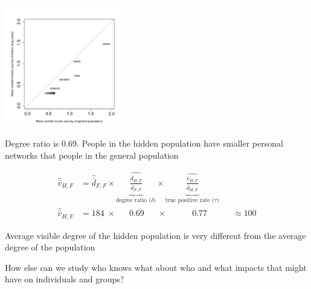 \documentclass[aspectratio=169]{beamer}
\begin{document}
\begin{frame}

\begin{center}	
\includegraphics[width=0.4\textwidth]{figures/degreeratio_names}
\end{center}

Degree ratio is 0.69.  People in the hidden population have smaller personal networks that people in the general population

\end{frame}
\begin{frame}

\begin{align*}
\hat{\bar{v}}_{H,F} & = \hat{\bar{d}}_{F,F}  \times \underbrace{ \widehat{ \frac{ \bar{d}_{H,F} } { \bar{d}_{F,F} } } }_{\text{degree ratio ($\delta$)}} \times \underbrace{ \widehat{ \frac{ \bar{v}_{H,F} } { \bar{d}_{H,F} } } }_{\text{true positive rate ($\tau$)}} \\
\hat{\bar{v}}_{H,F} & = 184 \; \times \quad \; \; 0.69 \quad \; \; \times \quad \qquad 0.77 \quad \qquad \approx 100
\end{align*}

Average visible degree of the hidden population is very different from the average degree of the population

\end{frame}
\begin{frame}

How else can we study who knows what about who and what impacts that might have on individuals and groups?

\end{frame}
\end{document}
